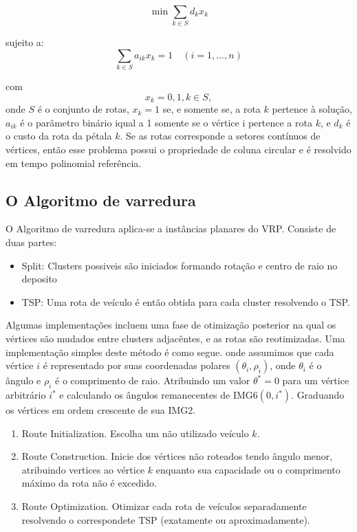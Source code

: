 \documentclass[a4paper, 12pt]{article}
\begin{document}
 \[\min \sum_{k\in S} d_k x_k\]

sujeito a:
 \[\sum_{k\in S} a_{ik} x_k = 1 \quad (i=1, \ldots, n)\]

com 
 \[x_k = {0,1}, k\in S,\]
 onde $S$ é o conjunto de rotas, $x_k=1$ se, e somente se, a rota $k$ pertence à solução, $a_{ik}$ é
o parâmetro binário iqual a 1 somente se o vértice i pertence a rota $k$, e $d_k$ é o custo da rota
da pétala $k$. Se as rotas corresponde a setores contínuos de vértices, então esse problema possui o
propriedade de coluna circular e é resolvido em tempo polinomial {\color{red} referência}.

\subsection{O Algoritmo de varredura}

 O Algoritmo de varredura aplica-se a instâncias planares do VRP. Consiste de duas partes:

\begin{itemize}
\item Split: Clusters possiveis são iniciados formando rotação e centro de raio no deposito
\item TSP: Uma rota de veículo é então obtida para cada cluster resolvendo o TSP.
\end{itemize}

 Algumas implementações incluem uma fase de otimização posterior na qual os vértices são mudados
entre clusters adjacêntes, e as rotas são reotimizadas. Uma implementação simples deste método
é como segue. onde assumimos que cada vértice $i$ é representado por suas coordenadas polares
$(\theta_i, \rho_i)$, onde $\theta_i$ é o ângulo e $\rho_i$ é o comprimento de raio. Atribuindo um
valor $\theta^* = 0$ para um vértice arbitrário $i^*$ e calculando os ângulos remanecentes de
IMG6$(0,i^*)$. Graduando os vértices em ordem crescente de sua IMG2.

\begin{enumerate}
\item Route Initialization. Escolha um não utilizado veículo $k$.
\item Route Construction. Inicie dos vértices não roteados tendo ângulo menor, atribuindo vertices
ao vértice $k$ enquanto sua capacidade ou o comprimento máximo da rota não é excedido.
\item Route Optimization. Otimizar cada rota de veículos separadamente resolvendo o correspondete
TSP (exatamente ou aproximadamente).
\end{enumerate}
\end{document}
